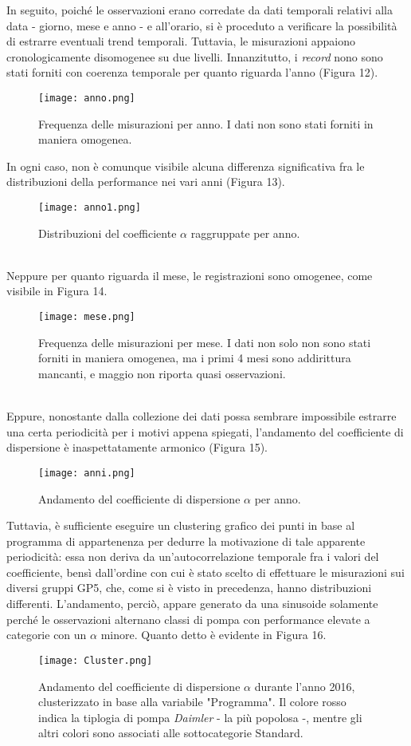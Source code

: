 \documentclass[fleqn,10pt]{SelfArx} %
\begin{document}
In seguito, poiché le osservazioni erano corredate da dati temporali relativi alla data - giorno, mese e anno - e all'orario, si è proceduto a verificare la possibilità di estrarre eventuali trend temporali. Tuttavia, le misurazioni appaiono cronologicamente disomogenee su due livelli. Innanzitutto, i \textit{record} nono sono stati forniti con coerenza temporale per quanto riguarda l'anno (Figura 12). 
\begin{figure}[h]
    \centering
    \texttt{[image: anno.png]}
    \label{fig:em}
    \caption{Frequenza delle misurazioni per anno. I dati non sono stati forniti in maniera omogenea.}
\end{figure}
In ogni caso, non è comunque visibile alcuna differenza significativa fra le distribuzioni della performance nei vari anni (Figura 13).
\begin{figure}[h]
    \centering
    \texttt{[image: anno1.png]}
    \label{fig:em}
    \caption{Distribuzioni del coefficiente $\alpha$ raggruppate per anno.}
\end{figure}
\\
Neppure per quanto riguarda il mese, le registrazioni sono omogenee, come visibile in Figura 14.
\begin{figure}[h]
    \centering
    \texttt{[image: mese.png]}
    \label{fig:em}
    \caption{Frequenza delle misurazioni per mese. I dati non solo non sono stati forniti in maniera omogenea, ma i primi 4 mesi sono addirittura mancanti, e maggio non riporta quasi osservazioni.}
\end{figure}
\\
Eppure, nonostante dalla collezione dei dati possa sembrare impossibile estrarre una certa periodicità per i motivi appena spiegati, l'andamento del coefficiente di dispersione è inaspettatamente armonico (Figura 15).
\begin{figure}[h]
    \centering
    \texttt{[image: anni.png]}
    \label{fig:em}
    \caption{Andamento del coefficiente di dispersione $\alpha$ per anno.}
\end{figure}
Tuttavia, è sufficiente eseguire un clustering grafico dei punti in base al programma di appartenenza per dedurre la motivazione di tale apparente periodicità: essa non deriva da un'autocorrelazione temporale fra i valori del coefficiente, bensì dall'ordine con cui è stato scelto di effettuare le misurazioni sui diversi gruppi GP5, che, come si è visto in precedenza, hanno distribuzioni differenti. L'andamento, perciò, appare generato da una sinusoide solamente perché le osservazioni alternano classi di pompa con performance elevate a categorie con un $\alpha$ minore. Quanto detto è evidente in Figura 16.
\begin{figure}[h]
    \centering
    \texttt{[image: Cluster.png]}
    \label{fig:em}
    \caption{Andamento del coefficiente di dispersione $\alpha$ durante l'anno 2016, clusterizzato in base alla variabile "Programma". Il colore rosso indica la tiplogia di pompa \textit{Daimler} - la più popolosa -, mentre gli altri colori sono associati alle sottocategorie Standard.}
\end{figure}
\end{document}

